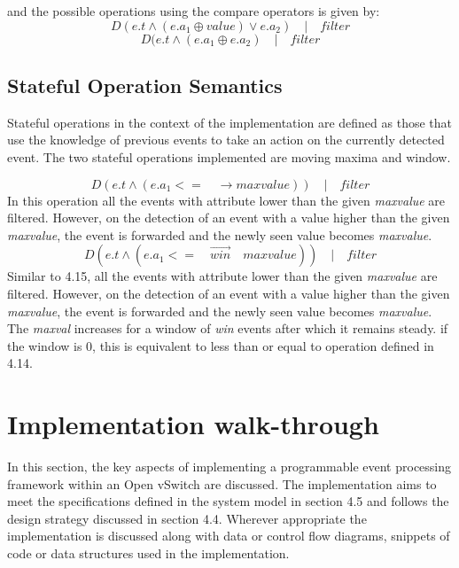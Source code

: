 and the possible operations using the compare operators is given by:
\begin{equation}
D(e.t  \wedge (e.a_1 \oplus value) \vee e.a_2) \quad | \quad filter
\end{equation}
\begin{equation}
D(e.t  \wedge (e.a_1 \oplus e.a_2) \quad | \quad filter
\end{equation}
\subsection{Stateful Operation Semantics}
Stateful operations in the context of the implementation are defined as those that use the knowledge of previous events to take an action on the currently detected event. The two stateful operations implemented are moving maxima and window.

\begin{equation}
D(e.t  \wedge (e.a_1  <=\quad \rightarrow maxvalue) ) \quad | \quad filter
\end{equation}
In this operation all the events with attribute lower than the given \textit{maxvalue} are filtered. However, on the detection of an event with a value higher than the given \textit{maxvalue}, the event is forwarded and the newly seen value becomes \textit{maxvalue}.
\begin{equation}
D(e.t  \wedge (e.a_1  <=\quad \overrightarrow{win} \quad maxvalue)) \quad | \quad filter
\end{equation}
Similar to 4.15,  all the events with attribute lower than the given \textit{maxvalue} are filtered. However, on the detection of an event with a value higher than the given \textit{maxvalue}, the event is forwarded and the newly seen value becomes \textit{maxvalue}. The \textit{maxval} increases for a window of \textit{win} events after which it remains steady. if the window is 0, this is equivalent to less than or equal to operation defined in 4.14.

\section{Implementation walk-through}
In this section, the key aspects of implementing a programmable event processing framework within an Open vSwitch are discussed. The implementation aims to meet the specifications defined in the system model in section 4.5 and follows the design strategy discussed in section 4.4. Wherever appropriate the implementation is discussed along with data or control flow diagrams, snippets of code or data structures used in the implementation.

